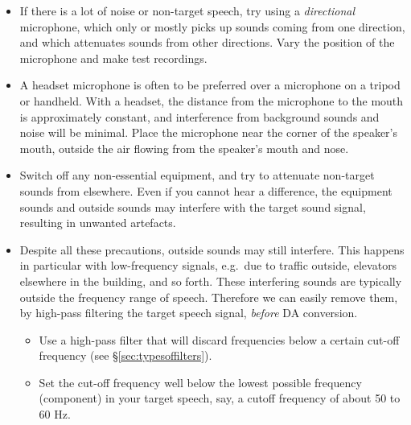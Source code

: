\documentclass[
]{book}
\providecommand{\tightlist}{%
  \setlength{\itemsep}{0pt}\setlength{\parskip}{0pt}}
\begin{document}
\begin{itemize}
  \textbf{Background}: Phonetic analyses typically aim at finding acoustic properties in the speech signal that may be related and relatable to the speaker's articulations and prosody. However, similar spectral properties (e.g.~resonances, formants, see §\ref{sec:formants} and Ch.\ref{ch-LPC}) may also arise from acoustic reflections in the recording room, and it may be difficult or impossible to disentangle similar spectral properties coming from different origins. Hence it helps to minimize any acoustic reflections in the recording room\footnote{\emph{Frequency} and \emph{formant} measurements may be suspect if the corresponding \emph{wavelength} (for frequencies) or wavelength \(\times 4\) or wavelength \(\times 2\) (for formants) corresponds to one of the dimensions of the room (see §\ref{sec:wavelength} and §\ref{sec:measureformants}); or if the reported formant frequency is below 200 Hz; or if the reliability of the frequency measurement is low.}.
\item
  If there is a lot of noise or non-target speech, try using a \emph{directional} microphone, which only or mostly picks up sounds coming from one direction, and which attenuates sounds from other directions. Vary the position of the microphone and make test recordings.
\item
  A headset microphone is often to be preferred over a microphone on a tripod or handheld. With a headset, the distance from the microphone to the mouth is approximately constant, and interference from background sounds and noise will be minimal. Place the microphone near the corner of the speaker's mouth, outside the air flowing from the speaker's mouth and nose.
\item
  Switch off any non-essential equipment, and try to attenuate non-target sounds from elsewhere. Even if you cannot hear a difference, the equipment sounds and outside sounds may interfere with the target sound signal, resulting in unwanted artefacts.
\item
  Despite all these precautions, outside sounds may still interfere. This happens in particular with low-frequency signals, e.g.~due to traffic outside, elevators elsewhere in the building, and so forth. These interfering sounds are typically outside the frequency range of speech. Therefore we can easily remove them, by high-pass filtering the target speech signal, \emph{before} DA conversion.

  \begin{itemize}
  \tightlist
  \item
    Use a high-pass filter that will discard frequencies below a certain cut-off frequency (see §\ref{sec:typesoffilters}).
  \item
    Set the cut-off frequency well below the lowest possible frequency (component) in your target speech, say, a cutoff frequency of about 50 to 60 Hz.
  \end{itemize}
\end{itemize}
\end{document}
